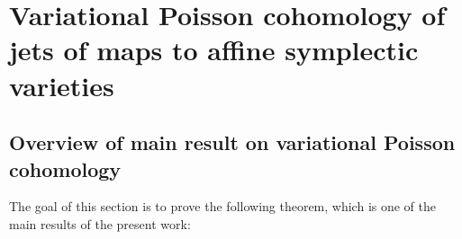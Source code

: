 \documentclass[11pt]{amsart}
\numberwithin{equation}{section}
\theoremstyle{definition}
\newcommand{\bb}{\mathbb}
\newcommand{\mc}{\mathcal}
\newcommand{\Rees}{{\textup{Rees}}}
\newcommand{\OEnd}{{\textup{End}}}
\newcommand{\Kh}{{\K[\hbar]}}
\newcommand{\Kfph}{{\mathbb{K}[\![\hbar]\!]}}
\newcommand{\gd}{{\textup{gr}}}
\DeclareMathOperator{\Hom}{Hom}
\newcommand{\K}{{\bb K}}
\newcommand{\ch}{{\textup{ch}}}
\newcommand{\0}{{\textbf{0}}}
\newcommand{\DD}{{D}}
\newcommand{\Z}{\bb Z}
\def\ch{{\rm ch}}
\begin{document}
%
%




\section{Variational Poisson cohomology of jets of maps to affine symplectic varieties}\label{varsec}

\subsection{Overview of main result on variational Poisson cohomology}
The goal of this section is to prove the following theorem, which is one of the main results of the present work:
\end{document}
